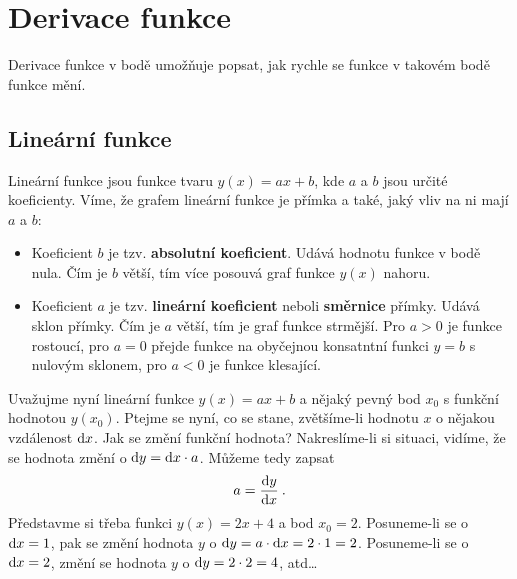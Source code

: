 \section*{Derivace funkce}

Derivace funkce v bodě umožňuje popsat, jak rychle se funkce v takovém bodě funkce mění.

\subsection*{Lineární funkce}

Lineární funkce jsou funkce tvaru $y(x) = ax+b$, kde $a$ a $b$ jsou určité koeficienty. Víme, že grafem lineární funkce je přímka a také, jaký vliv na ni mají $a$ a $b$:
\begin{itemize}
    \item Koeficient $b$ je tzv. \textbf{absolutní koeficient}. Udává hodnotu funkce v bodě nula. Čím je $b$ větší, tím více posouvá graf funkce $y(x)$ nahoru.
    \item Koeficient $a$ je tzv. \textbf{lineární koeficient} neboli \textbf{směrnice} přímky. Udává sklon přímky. Čím je $a$ větší, tím je graf funkce strmější. Pro $a>0$ je funkce rostoucí, pro $a=0$ přejde funkce na obyčejnou konsatntní funkci $y=b$ s nulovým sklonem, pro $a<0$ je funkce klesající.
\end{itemize}

Uvažujme nyní lineární funkce $y(x)=ax+b$ a nějaký pevný bod $x_0$ s funkční hodnotou $y(x_0)$. Ptejme se nyní, co se stane, zvětšíme-li hodnotu $x$ o nějakou vzdálenost $\mathrm{d} x$. Jak se změní funkční hodnota? Nakreslíme-li si situaci, vidíme, že se hodnota změní o $\mathrm{d} y = \mathrm{d} x \cdot a$. Můžeme tedy zapsat
\begin{align}
    a = \frac{\mathrm{d} y}{\mathrm{d} x} \:.
\end{align}
Představme si třeba funkci $y(x)=2x+4$ a bod $x_0=2$. Posuneme-li se o $\mathrm{d} x = 1$, pak se změní hodnota $y$ o $\mathrm{d} y = a \cdot \mathrm{d} x = 2 \cdot 1 = 2$. Posuneme-li se o $\mathrm{d} x = 2$, změní se hodnota $y$ o $\mathrm{d} y = 2 \cdot 2 = 4$, atd\dots

